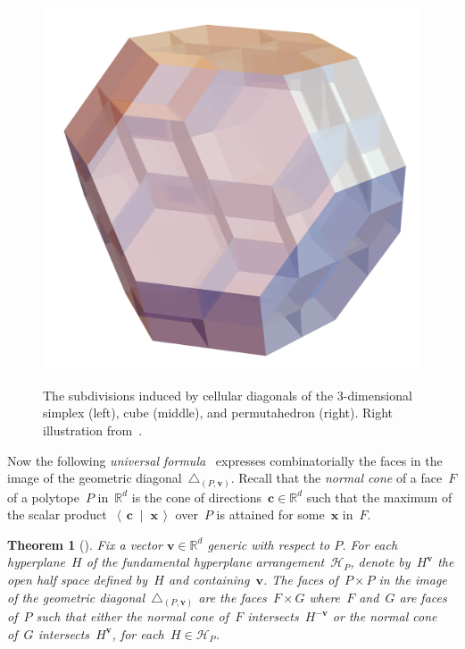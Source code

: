 \documentclass{amsart}
\newcommand{\darkblue}{\color{darkblue}} %
\newtheorem{theorem}{Theorem}[section]
\theoremstyle{definition}
\newcommand{\R}{\mathbb{R}} %
\renewcommand{\b}[1]{{\boldsymbol{#1}}} %
\newcommand{\dotprod}[2]{\left\langle \, #1 \; \middle| \; #2 \, \right\rangle} %
\newcommand{\defn}[1]{\textsl{\darkblue #1}} %
\renewcommand{\b}[1]{\boldsymbol{#1}} %
\begin{document}
\begin{figure}
{		\includegraphics[scale=.3]{diagonalPermutahedronGuillaume.png}
	}
	\caption{The subdivisions induced by cellular diagonals of the $3$-dimensional simplex (left), cube (middle), and permutahedron (right). Right illustration from~\cite[Fig.~13]{LaplanteAnfossi}.}
	\label{fig:examplesDiagonals2}
\end{figure}

Now the following \defn{universal formula}~\cite[Thm.~1.26]{LaplanteAnfossi} expresses combinatorially the faces in the image of the geometric diagonal~$\triangle_{(P,\b{v})}$.
Recall that the \defn{normal cone} of a face~$F$ of a polytope~$P$ in~$\R^d$ is the cone of directions~$\b{c} \in \R^d$ such that the maximum of the scalar product~$\dotprod{\b{c}}{\b{x}}$ over~$P$ is attained for some~$\b{x}$ in~$F$.

\begin{theorem}[{\cite[Thm.~1.26]{LaplanteAnfossi}}]
\label{thm:universalFormula}
Fix a vector $\b{v} \in \R^d$ generic with respect to $P$.
For each hyperplane~$H$ of the fundamental hyperplane arrangement~$\mathcal{H}_P$, denote by~$H^{\b{v}}$ the open half space defined by~$H$ and containing~$\b{v}$.
The faces of~$P \times P$ in the image of the geometric diagonal~$\triangle_{(P,\b{v})}$ are the faces~$F \times G$ where~$F$ and~$G$ are faces of~$P$ such that either the normal cone of~$F$ intersects~$H^{-\b{v}}$ or the normal cone of~$G$ intersects~$H^{\b{v}}$, for each~$H \in \mathcal{H}_P$.
\end{theorem}
\end{document}
